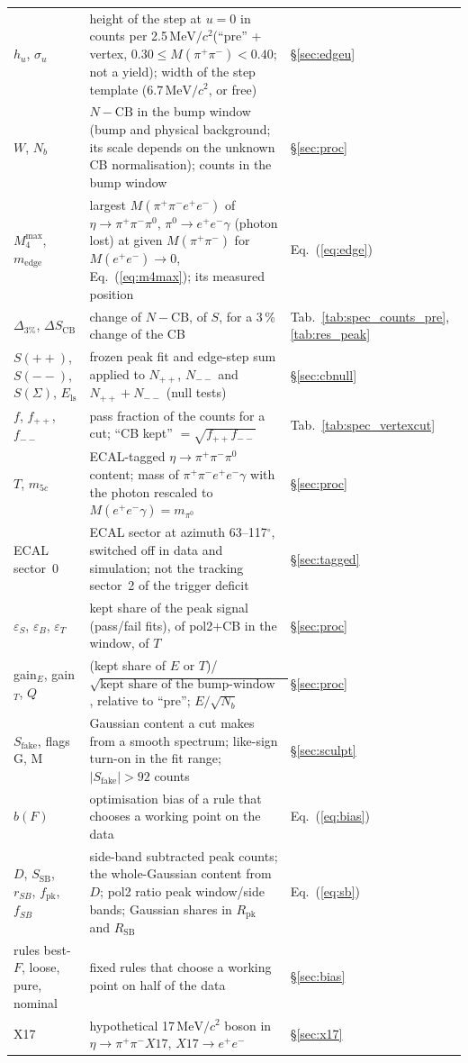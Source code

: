 \documentclass[11pt,a4paper]{article}
\newcommand{\piz}{\ensuremath{\pi^{0}}\xspace}
\newcommand{\ee}{\ensuremath{e^{+}e^{-}}\xspace}
\newcommand{\pipi}{\ensuremath{\pi^{+}\pi^{-}}\xspace}
\newcommand{\ppee}{\ensuremath{\pi^{+}\pi^{-}e^{+}e^{-}}\xspace}
\newcommand{\Mfour}{\ensuremath{M(\pi^{+}\pi^{-}e^{+}e^{-})}\xspace}
\newcommand{\Mee}{\ensuremath{M(e^{+}e^{-})}\xspace}
\newcommand{\Mpipi}{\ensuremath{M(\pi^{+}\pi^{-})}\xspace}
\newcommand{\MeVcc}{\ensuremath{\mathrm{MeV}/c^{2}}\xspace}
\begin{document}
{\begin{longtable}{@{}>{\raggedright\arraybackslash}p{3.0cm} >{\raggedright\arraybackslash}p{\dimexpr\textwidth-3.0cm-2.2cm-4\tabcolsep\relax} >{\raggedright\arraybackslash}p{2.2cm}@{}}
$h_u$, $\sigma_u$ & height of the step at $u=0$ in counts per 2.5\,\MeVcc (``pre'' + vertex, $0.30\le\Mpipi<0.40$; not a yield); width of the step template (6.7\,\MeVcc, or free) & \S\ref{sec:edgeu} \\
$W$, $N_b$ & $N-\mathrm{CB}$ in the bump window (bump and physical background; its scale depends on the unknown CB normalisation); counts in the bump window & \S\ref{sec:proc} \\
$M_4^{\max}$, $m_{\mathrm{edge}}$ & largest \Mfour of $\eta\to\pipi\piz$, $\piz\to\ee\gamma$ (photon lost) at given \Mpipi for $\Mee\to0$, Eq.~(\ref{eq:m4max}); its measured position & Eq.~(\ref{eq:edge}) \\
$\Delta_{3\%}$, $\Delta S_{\mathrm{CB}}$ & change of $N-\mathrm{CB}$, of $S$, for a 3\,\% change of the CB & Tab.~\ref{tab:spec_counts_pre}, \ref{tab:res_peak} \\
$S(++)$, $S(--)$, $S(\Sigma)$, $E_{\mathrm{ls}}$ & frozen peak fit and edge-step sum applied to $N_{++}$, $N_{--}$ and $N_{++}+N_{--}$ (null tests) & \S\ref{sec:cbnull} \\
$f$, $f_{++}$, $f_{--}$ & pass fraction of the counts for a cut; ``CB kept'' $=\sqrt{f_{++}f_{--}}$ & Tab.~\ref{tab:spec_vertexcut} \\
$T$, $m_{5c}$ & ECAL-tagged $\eta\to\pipi\piz$ content; mass of \ppee$\gamma$ with the photon rescaled to $M(\ee\gamma)=m_{\pi^0}$ & \S\ref{sec:proc} \\
ECAL sector~0 & ECAL sector at azimuth 63--117$^\circ$, switched off in data and simulation; not the tracking sector~2 of the trigger deficit & \S\ref{sec:tagged} \\
$\varepsilon_S$, $\varepsilon_B$, $\varepsilon_T$ & kept share of the peak signal (pass/fail fits), of pol2+CB in the window, of $T$ & \S\ref{sec:proc} \\
gain$_E$, gain$_T$, $Q$ & (kept share of $E$ or $T$)/$\sqrt{\text{kept share of the bump-window counts}}$, relative to ``pre''; $E/\sqrt{N_b}$ & \S\ref{sec:proc} \\
$S_{\mathrm{fake}}$, flags G, M & Gaussian content a cut makes from a smooth spectrum; like-sign turn-on in the fit range; $|S_{\mathrm{fake}}|>92$ counts & \S\ref{sec:sculpt} \\
$b(F)$ & optimisation bias of a rule that chooses a working point on the data & Eq.~(\ref{eq:bias}) \\
$D$, $S_{\mathrm{SB}}$, $r_{SB}$, $f_{\mathrm{pk}}$, $f_{SB}$ & side-band subtracted peak counts; the whole-Gaussian content from $D$; pol2 ratio peak window/side bands; Gaussian shares in $R_{\mathrm{pk}}$ and $R_{\mathrm{SB}}$ & Eq.~(\ref{eq:sb}) \\
rules best-$F$, loose, pure, nominal & fixed rules that choose a working point on half of the data & \S\ref{sec:bias} \\
X17 & hypothetical 17\,\MeVcc boson in $\eta\to\pipi X17$, $X17\to\ee$ & \S\ref{sec:x17} \\
\end{longtable}
}
\end{document}
